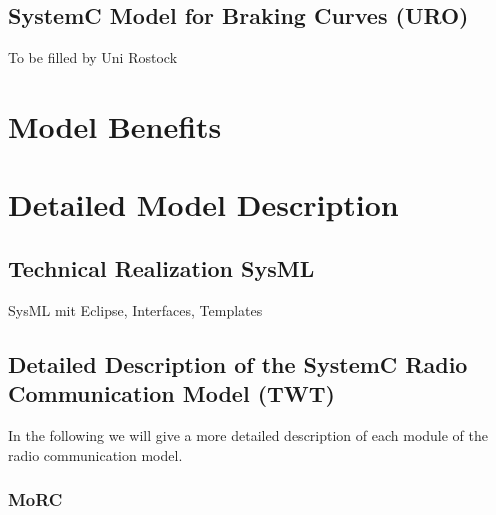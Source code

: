 \documentclass{template/openetcs_article}
\begin{document}
\subsection{SystemC Model for Braking Curves (URO)}

To be filled by Uni Rostock

\section{Model Benefits}
\label{sec:model-highlights}

%
%


\section{Detailed Model Description}
\label{sec:deta-model-descr}

\subsection{Technical Realization SysML}
SysML mit Eclipse, Interfaces, Templates

\subsection{Detailed Description of the SystemC Radio Communication Model (TWT)}
\label{sct:radiocommdetailed}

In the following we will give a more detailed description of each module of the radio communication model.

\subsubsection{MoRC}
\end{document}
